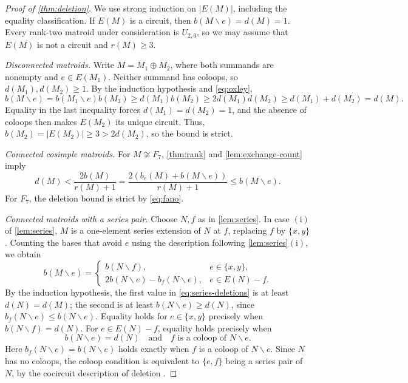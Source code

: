 \documentclass[11pt]{article}
\numberwithin{equation}{section}
\begin{document}
\begin{proof}[Proof of \autoref{thm:deletion}]
We use strong induction on \(|E(M)|\), including the equality classification.
If \(E(M)\) is a circuit, then \(b(M\backslash e)=d(M)=1\).
Every rank-two matroid under consideration is \(U_{2,3}\),
so we may assume that \(E(M)\) is not a circuit and \(r(M)\ge3\).

\emph{Disconnected matroids.}
Write \(M=M_1\oplus M_2\), where both summands are nonempty
and \(e\in E(M_1)\).
Neither summand has coloops, so \(d(M_1),d(M_2)\ge1\).
By the induction hypothesis and \eqref{eq:oxley},
\[
 b(M\backslash e)=b(M_1\backslash e)b(M_2)\ge d(M_1)b(M_2)\ge2d(M_1)d(M_2)\ge d(M_1)+d(M_2)=d(M).
\]
Equality in the last inequality forces \(d(M_1)=d(M_2)=1\),
and the absence of coloops then makes \(E(M_2)\) its unique circuit.
Thus, \(b(M_2)=|E(M_2)|\ge3>2d(M_2)\), so the bound is strict.

\emph{Connected cosimple matroids.}
For \(M\not\cong F_7\), \autoref{thm:rank} and
\autoref{lem:exchange-count} imply
\[
 d(M)<\frac{2b(M)}{r(M)+1}
 =\frac{2(b_e(M)+b(M\backslash e))}{r(M)+1}
 \le b(M\backslash e).
\]
For \(F_7\), the deletion bound is strict by \eqref{eq:fano}.

\emph{Connected matroids with a series pair.}
Choose \(N,f\) as in \autoref{lem:series}.
In case \(\mathrm{(i)}\) of \autoref{lem:series}, \(M\) is a
one-element series extension of \(N\) at \(f\), replacing
\(f\) by \(\{x,y\}\).
Counting the bases that avoid \(e\) using the description following
\autoref{lem:series}\(\mathrm{(i)}\), we obtain
\begin{equation}\label{eq:series-deletions}
 b(M\backslash e)=
 \begin{cases}
 b(N\backslash f),&e\in\{x,y\},\\
 2b(N\backslash e)-b_f(N\backslash e),&e\in E(N)-f.
 \end{cases}
\end{equation}
By the induction hypothesis, the first value in
\eqref{eq:series-deletions} is at least \(d(N)=d(M)\);
the second is at least \(b(N\backslash e)\ge d(N)\), since
\(b_f(N\backslash e)\le b(N\backslash e)\).
Equality holds for \(e\in\{x,y\}\) precisely when
\(b(N\backslash f)=d(N)\). For \(e\in E(N)-f\), equality holds precisely when
\[
 b(N\backslash e)=d(N)
 \quad\text{and}\quad f\text{ is a coloop of }N\backslash e.
\]
Here \(b_f(N\backslash e)=b(N\backslash e)\) holds exactly when
\(f\) is a coloop of \(N\backslash e\).
Since \(N\) has no coloops, the coloop condition is equivalent
to \(\{e,f\}\) being a series pair of \(N\), by the cocircuit
description of deletion \cite[(3.1.16)]{Oxley2011}.


\end{proof}
\end{document}
